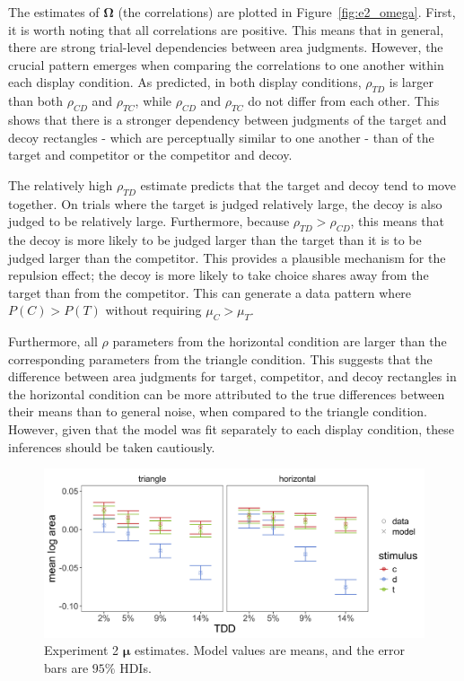The estimates of $\boldsymbol{\Omega}$ (the correlations) are plotted in Figure~\ref{fig:e2_omega}. First, it is worth noting that all correlations are positive. This means that in general, there are strong trial-level dependencies between area judgments. However, the crucial pattern emerges when comparing the correlations to one another within each display condition. As predicted, in both display conditions, $\rho_{TD}$ is larger than both $\rho_{CD}$ and $\rho_{TC}$, while $\rho_{CD}$ and $\rho_{TC}$ do not differ from each other. This shows that there is a stronger dependency between judgments of the target and decoy rectangles - which are perceptually similar to one another - than of the target and competitor or the competitor and decoy.  

The relatively high $\rho_{TD}$ estimate predicts that the target and decoy tend to move together. On trials where the target is judged relatively large, the decoy is also judged to be relatively large. Furthermore, because $\rho_{TD}>\rho_{CD}$, this means that the decoy is more likely to be judged larger than the target than it is to be judged larger than the competitor. This provides a plausible mechanism for the repulsion effect; the decoy is more likely to take choice shares away from the target than from the competitor. This can generate a data pattern where $P(C)>P(T)$ without requiring $\mu_{C}>\mu_{T}$. 

Furthermore, all $\rho$ parameters from the horizontal condition are larger than the corresponding parameters from the triangle condition. This suggests that the difference between area judgments for target, competitor, and decoy rectangles in the horizontal condition can be more attributed to the true differences between their means than to general noise, when compared to the triangle condition. However, given that the model was fit separately to each display condition, these inferences should be taken cautiously.

\begin{figure}
   \includegraphics[width=130mm]{figures/bayes_circle_area_mu_sigma_constant_comp_effect_model_v_data_collapsed.jpeg}
   \caption{Experiment 2 $\boldsymbol{\mu}$ estimates. Model values are means, and the error bars are $95\%$ HDIs.}
   \label{fig:e2mu}
\end{figure}

